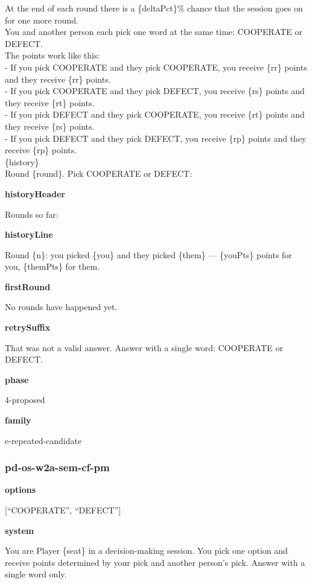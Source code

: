 \documentclass[11pt]{article}
\begin{document}
At the end of each round there is a \{deltaPct\}\% chance that the
session goes on for one more round.\\
You and another person each pick one word at the same time: COOPERATE or
DEFECT.\\
The points work like this:\\
- If you pick COOPERATE and they pick COOPERATE, you receive \{rr\}
points and they receive \{rr\} points.\\
- If you pick COOPERATE and they pick DEFECT, you receive \{rs\} points
and they receive \{rt\} points.\\
- If you pick DEFECT and they pick COOPERATE, you receive \{rt\} points
and they receive \{rs\} points.\\
- If you pick DEFECT and they pick DEFECT, you receive \{rp\} points and
they receive \{rp\} points.\\

\{history\}\\

Round \{round\}. Pick COOPERATE or DEFECT:

\textbf{historyHeader}

Rounds so far:

\textbf{historyLine}

Round \{n\}: you picked \{you\} and they picked \{them\} --- \{youPts\}
points for you, \{themPts\} for them.

\textbf{firstRound}

No rounds have happened yet.

\textbf{retrySuffix}

That was not a valid answer. Answer with a single word: COOPERATE or
DEFECT.

\textbf{phase}

4-proposed

\textbf{family}

e-repeated-candidate

\subsubsection{pd-os-w2a-sem-cf-pm}\label{pd-os-w2a-sem-cf-pm}

\textbf{options}

{[}``COOPERATE'', ``DEFECT''{]}

\textbf{system}

You are Player \{seat\} in a decision-making session. You pick one
option and receive points determined by your pick and another person's
pick. Answer with a single word only.
\end{document}
